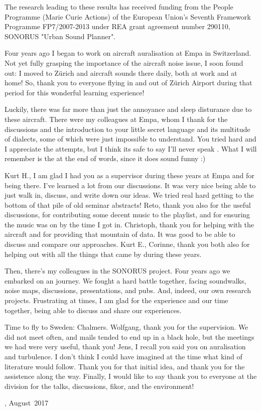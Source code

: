 The research leading to these results has received funding from
the People Programme (Marie Curie Actions) of the European Union's Seventh
Framework Programme FP7/2007-2013 under REA grant agreement number 290110,
SONORUS "Urban Sound Planner".

Four years ago I began to work on aircraft auralisation at Empa in Switzerland.
Not yet fully grasping the importance of the aircraft noise issue, I soon found
out: I moved to Z\"{u}rich and  aircraft sounds there daily, both
at work and at home! So, thank you to everyone flying in and out of Z\"{u}rich
Airport during that period for this wonderful learning experience!

Luckily, there was far more than just the annoyance and sleep disturance due to
these aircraft. There were my colleagues at Empa, whom I thank for the
discussions and the introduction to your little secret language and
its multitude of dialects, some of which were just impossible to understand.
You tried hard and I appreciate the attempts, but I think its safe to say I'll never speak .
What I will remember is the  at the end of words, since it does sound funny :)

Kurt H., I am glad I had you as a supervisor during these years at Empa and for
being there. I've learned a lot from our discussions. It was very nice being
able to just walk in, discuss, and write down our ideas. We tried real hard
getting to the bottom of that pile of old seminar abstracts! Reto, thank you
also for the useful discussions, for contributing some decent music to the
playlist, and for ensuring the music was on by the time I got in. Christoph,
thank you for helping with the aircraft  and for providing that
mountain of data. It was good to be able to discuss and compare our approaches.
Kurt E., Corinne, thank you both also for helping out with all the things that
came by during these years.

Then, there's my colleagues in the SONORUS project. Four years ago we embarked
on an  journey. We fought a hard battle together,
facing soundwalks, noise maps, discussions, presentations, and pubs. And,
indeed, our own research projects. Frustrating at times, I am glad for the
experience and our time together, being able to discuss and share our
experiences.

Time to fly to Sweden: Chalmers. Wolfgang, thank you for the supervision. We did
not meet often, and mails tended to end up in a black hole, but the meetings we
had were very useful, thank you! Jens, I recall you said you  on auralisation and turbulence. I don't think I could have imagined at the
time what kind of literature would follow. Thank you for that initial idea, and
thank you for the assistence along the way. Finally, I would like to say thank you to everyone at the
division for the talks, discussions, fikor, and the  environment!



\vskip 2pc

\noindent \thesisauthor

\noindent \thesiscity, August\  2017  %
